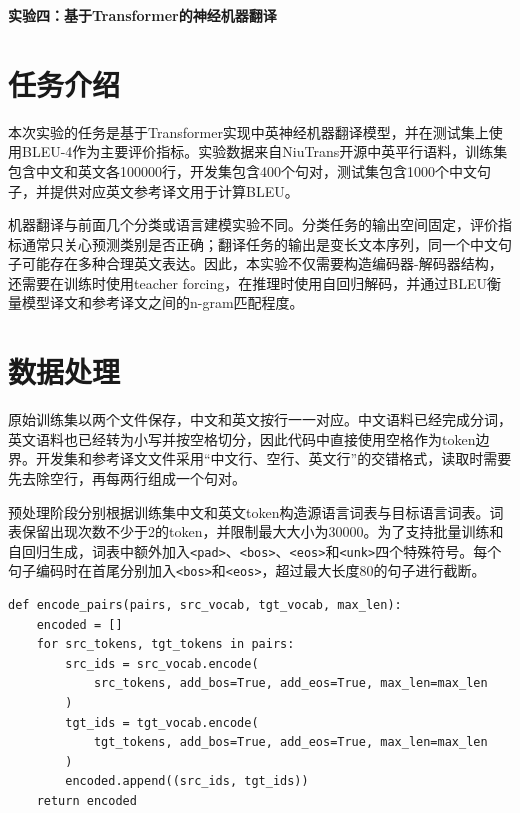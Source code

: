 \documentclass[11pt]{article}
\begin{document}
	\pagestyle{fancy}
	\chead{}
	
	\begin{center}
		{\LARGE \bf 实验四：基于Transformer的神经机器翻译}
	\end{center}
	\begin{center}
		\large{}
	\end{center}

	\section{任务介绍}
	本次实验的任务是基于Transformer实现中英神经机器翻译模型，并在测试集上使用BLEU-4作为主要评价指标。实验数据来自NiuTrans开源中英平行语料，训练集包含中文和英文各100000行，开发集包含400个句对，测试集包含1000个中文句子，并提供对应英文参考译文用于计算BLEU。

	机器翻译与前面几个分类或语言建模实验不同。分类任务的输出空间固定，评价指标通常只关心预测类别是否正确；翻译任务的输出是变长文本序列，同一个中文句子可能存在多种合理英文表达。因此，本实验不仅需要构造编码器-解码器结构，还需要在训练时使用teacher forcing，在推理时使用自回归解码，并通过BLEU衡量模型译文和参考译文之间的n-gram匹配程度。

	\section{数据处理}
	原始训练集以两个文件保存，中文和英文按行一一对应。中文语料已经完成分词，英文语料也已经转为小写并按空格切分，因此代码中直接使用空格作为token边界。开发集和参考译文文件采用``中文行、空行、英文行''的交错格式，读取时需要先去除空行，再每两行组成一个句对。

	预处理阶段分别根据训练集中文和英文token构造源语言词表与目标语言词表。词表保留出现次数不少于2的token，并限制最大大小为30000。为了支持批量训练和自回归生成，词表中额外加入\texttt{<pad>}、\texttt{<bos>}、\texttt{<eos>}和\texttt{<unk>}四个特殊符号。每个句子编码时在首尾分别加入\texttt{<bos>}和\texttt{<eos>}，超过最大长度80的句子进行截断。

	\begin{lstlisting}
def encode_pairs(pairs, src_vocab, tgt_vocab, max_len):
    encoded = []
    for src_tokens, tgt_tokens in pairs:
        src_ids = src_vocab.encode(
            src_tokens, add_bos=True, add_eos=True, max_len=max_len
        )
        tgt_ids = tgt_vocab.encode(
            tgt_tokens, add_bos=True, add_eos=True, max_len=max_len
        )
        encoded.append((src_ids, tgt_ids))
    return encoded
	\end{lstlisting}
\end{document}
